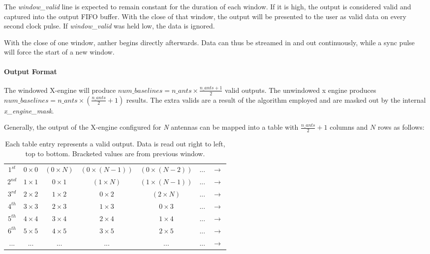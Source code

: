 {The \textit{window\_valid} line is expected to remain constant for the duration of each window. If it is high, the output is considered valid and captured into the output FIFO buffer. With the close of that window, the output will be presented to the user as valid data on every second clock pulse. If \textit{window\_valid} was held low, the data is ignored.

With the close of one window, anther begins directly afterwards. Data can thus be streamed in and out continuously, while a sync pulse will force the start of a new window.

\paragraph{Output Format}
The windowed X-engine will produce $num\_baselines = n\_ants \times \frac{n\_ants + 1}{2}$ valid outputs. The unwindowed x engine produces  $num\_baselines = n\_ants \times (\frac{n\_ants}{2} + 1)$ results. The extra valids are a result of the algorithm employed and are masked out by the internal \textit{x\_engine\_mask}.

Generally, the output of the X-engine configured for \textit{N} antennas can be mapped into a table with $\frac{n\_ants}{2} + 1$ columns and $N$ rows as follows:
\begin{table*}[h]
\centering
\begin{tabular}{c c c c c c c } 
$ 1^{st} $ & $ 0\times0 $ & $ (0\times N) $ & $ (0\times (N-1)) $ & $ (0\times (N-2)) $ & ... &$ \rightarrow $ \\ 
$ 2^{nd} $ & $ 1\times1 $ & $ 0\times1 $ & $ (1\times N) $ & $ (1\times (N-1)) $ & ... &$ \rightarrow $  \\ 
$ 3^{rd} $ & $ 2\times2 $ & $ 1\times2 $ & $ 0\times2 $ & $ (2\times N) $ & ... &$ \rightarrow $ \\ 
$ 4^{th} $ & $ 3\times3 $ & $ 2\times3 $ & $ 1\times3 $ & $ 0\times3 $ & ... &$ \rightarrow $ \\ 
$ 5^{th} $ & $ 4\times4 $ & $ 3\times4 $ & $ 2\times4 $ & $ 1\times4 $ & ... &$ \rightarrow $ \\ 
$ 6^{th} $ & $ 5\times5 $ & $ 4\times5 $ & $ 3\times5 $ & $ 2\times5 $ & ... &$ \rightarrow $ \\ 
... & ... & ... & ... & ... & ... & $ \rightarrow $ \\
\end{tabular}
\caption{Each table entry represents a valid output. Data is read out right to left, top to bottom. Bracketed values are from previous window.}
\label{tab:xengout}
\end{table*}

}
